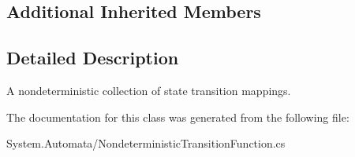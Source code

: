 \subsection*{Additional Inherited Members}


\subsection{Detailed Description}
A nondeterministic collection of state transition mappings. 



The documentation for this class was generated from the following file\+:\begin{DoxyCompactItemize}
\item 
System.\+Automata/Nondeterministic\+Transition\+Function.\+cs\end{DoxyCompactItemize}
